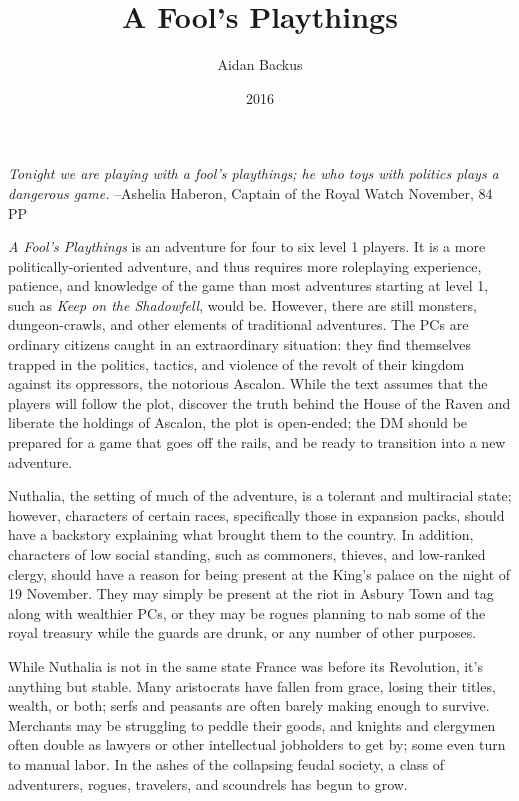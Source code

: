 \documentclass{report}
\theoremstyle{definition}
\begin{document}
\title{A Fool's Playthings}
\author{Aidan Backus}
\date{2016}
\maketitle
\begin{displayquote}
\textit{Tonight we are playing with a fool's playthings; he who toys with politics plays a dangerous game.}
\newline
--Ashelia Haberon, Captain of the Royal Watch
 November, 84 PP
\end{displayquote}
\textit{A Fool's Playthings} is an adventure for four to six level 1 players.  It is a more politically-oriented adventure, and thus requires more roleplaying experience, patience, and knowledge of the game than most adventures starting at level 1, such as \textit{Keep on the Shadowfell}, would be.  However, there are still monsters, dungeon-crawls, and other elements of traditional adventures.  The PCs are ordinary citizens caught in an extraordinary situation: they find themselves trapped in the politics, tactics, and violence of the revolt of their kingdom against its oppressors, the notorious Ascalon.  While the text assumes that the players will follow the plot, discover the truth behind the House of the Raven and liberate the holdings of Ascalon, the plot is open-ended; the DM should be prepared for a game that goes off the rails, and be ready to transition into a new adventure.

Nuthalia, the setting of much of the adventure, is a tolerant and multiracial state; however, characters of certain races, specifically those in expansion packs, should have a backstory explaining what brought them to the country.  In addition, characters of low social standing, such as commoners, thieves, and low-ranked clergy, should have a reason for being present at the King's palace on the night of 19 November.  They may simply be present at the riot in Asbury Town and tag along with wealthier PCs, or they may be rogues planning to nab some of the royal treasury while the guards are drunk, or any number of other purposes.

While Nuthalia is not in the same state France was before its Revolution, it's anything but stable.  Many aristocrats have fallen from grace, losing their titles, wealth, or both; serfs and peasants are often barely making enough to survive.  Merchants may be struggling to peddle their goods, and knights and clergymen often double as lawyers or other intellectual jobholders to get by; some even turn to manual labor.  In the ashes of the collapsing feudal society, a class of adventurers, rogues, travelers, and scoundrels has begun to grow.
\end{document}
